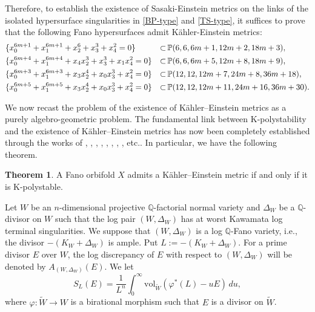\documentclass[12pt]{amsart}
\theoremstyle{definition}
\newtheorem{theorem}[equation]{Theorem}
\theoremstyle{remark}
\begin{document}
Therefore, to establish the existence of Sasaki-Einstein metrics on the links of the isolated hypersurface singularities in \eqref{BP-type} and \eqref{TS-type}, it suffices to prove that the following Fano hypersurfaces admit K\"ahler-Einstein metrics:
\begin{equation}\label{hypersurfaces}
\aligned
&\{x_0^{6m+1}+x_1^{6m+1}+x_2^{6}+x_3^{3}+x_4^{2}=0\}&\subset \, &\mathbb{P}(6,6,6m+1,12m+2,18m+3),\\
&\{x_0^{6m+4}+x_1^{6m+4}+x_4x_2^{3}+x_3^3+x_1x_4^2=0\}&\subset \,&\mathbb{P}(6,6,6m+5,12m+8,18m+9),\\
&\{x_0^{6m+3}+x_1^{6m+3}+x_3x_2^4+x_0x_3^3+x_4^2=0\}&\subset \,&\mathbb{P}(12,12,12m+7,24m+8,36m+18),\\
&\{x_0^{6m+5}+x_1^{6m+5}+x_3x_2^4+x_0x_3^3+x_4^2=0\}&\subset \,&\mathbb{P}(12,12,12m+11,24m+16,36m+30). \\
\endaligned
\end{equation}



We now recast the problem of the existence of Kähler–Einstein metrics as a purely algebro-geometric problem.
The fundamental link between K-polystability and the existence of Kähler–Einstein metrics has now been completely established through the works of  \cite{B16}, \cite{BBJ}, \cite{CDS1, CDS2, CDS3},  \cite{Li19}, \cite{LTW19},  \cite{LXZ22},  \cite{Tian15}, \cite{Xu21}, etc..  In particular, we have the following  theorem.
\begin{theorem}\label{theorem}
A Fano orbifold $X$ admits a Kähler–Einstein metric if and only if it is K-polystable.
\end{theorem}


Let $W$ be an $n$-dimensional  projective $\mathbb{Q}$-factorial normal variety and $\Delta_W$ be a $\mathbb{Q}$-divisor on $W$ such that the log pair $(W, \Delta_W)$ has at worst Kawamata log terminal singularities. 
We suppose that $(W,  \Delta_W)$ is a log  $\mathbb{Q}$-Fano variety, i.e., the divisor $-(K_W+ \Delta_W)$ is ample.  Put $L:=-(K_W+ \Delta_W)$.
For a prime divisor $E$ over $W$, the log discrepancy of $E$ with respect to $(W, \Delta_W)$ will be denoted by $A_{(W,\Delta_W)}(E)$. We let
\[S_L(E) =\frac{1}{L^n} \int_0^{\infty} \mathrm{vol}_{\widetilde{W}}(\varphi^*(L) - u E)\, du,\]
where $\varphi:\widetilde{W}\to W$ is a birational morphism such that $E$ is a divisor on $\widetilde{W}$.
\end{document}
